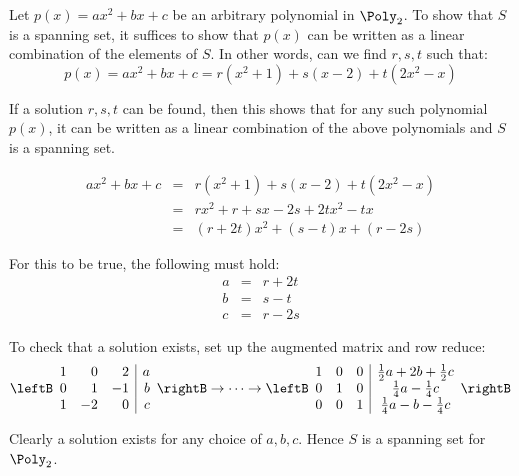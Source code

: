 \begin{solution}
Let $p(x)= ax^2 + bx + c$ be an arbitrary polynomial in $\Poly_2$. To show that $S$ is a spanning set, it suffices to show that $p(x)$ can be written as a linear combination of the elements of $S$. In other words, can we find $r,s,t$ such that:
\[
p(x) =  ax^2 +bx + c = r(x^2 + 1) + s(x -2) + t(2x^2 - x)
\]

If a solution $r,s,t$ can be found, then this shows that for any such polynomial $p(x)$, it can be written as a linear combination of the above polynomials and $S$ is a spanning set. 

\begin{eqnarray*}
ax^2 +bx + c &=& r(x^2 + 1) + s(x -2) + t(2x^2 - x) \\
&=& rx^2 + r + sx - 2s + 2tx^2 - tx \\
&=& (r+2t)x^2 + (s-t)x +  (r-2s) 
\end{eqnarray*}

For this to be true, the following must hold:
\begin{eqnarray*}
a &=& r+2t \\
b &=& s-t \\
c &=& r-2s
\end{eqnarray*}

To check that a solution exists, set up the augmented matrix and row reduce:
\[
\leftB \begin{array}{rrr|r}
1 & 0 & 2 & a \\
0 & 1 & -1 & b \\
1 & -2 & 0 & c 
\end{array} \rightB \rightarrow \cdots \rightarrow 
\leftB \begin{array}{rrr|c} 
1 & 0 & 0 & \frac{1}{2} a + 2b + \frac{1}{2}c\\
0 & 1 & 0 & \frac{1}{4}a - \frac{1}{4}c \\
0 & 0 & 1 & \frac{1}{4}a - b - \frac{1}{4}c 
\end{array} \rightB
\]

Clearly a solution exists for any choice of $a,b,c$. Hence $S$ is a spanning set for $\Poly_2$. 
\end{solution}

